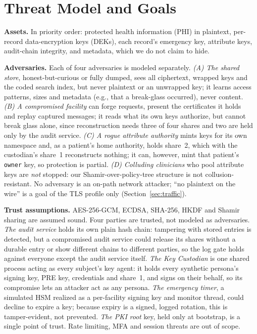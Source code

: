 \section{Threat Model and Goals}\label{sec:threat}

\textbf{Assets.} In priority order: protected health information (PHI) in plaintext, per-record data-encryption
keys (DEKs), each record's emergency key, attribute keys, audit-chain
integrity, and metadata, which we do not claim to hide. %

\textbf{Adversaries.} Each of four adversaries is modeled separately. %
\emph{(A) The shared store}, honest-but-curious or fully dumped, sees all
ciphertext, wrapped keys and the coded search index, but never plaintext or an
unwrapped key; it learns access patterns, sizes and metadata (e.g., that a
break-glass occurred), never content. %
\emph{(B) A compromised facility} can forge requests, present the
certificates it holds and replay captured messages; it reads what its own keys
authorize, but cannot break glass alone, since reconstruction needs three of
four shares and two are held only by the audit service. %
\emph{(C) A rogue attribute authority} mints keys for its own namespace and,
as a patient's home authority, holds share~2, which with the custodian's
share~1 reconstructs nothing; it can, however, mint that patient's
\texttt{owner} key, so protection is partial. %
\emph{(D) Colluding clinicians} who pool attribute keys are \emph{not}
stopped: our Shamir-over-policy-tree structure is not collusion-resistant.
No adversary is an on-path network attacker; ``no plaintext on the wire'' is
a goal of the TLS profile only (Section~\ref{sec:traffic}). %

\textbf{Trust assumptions.} AES-256-GCM, ECDSA, SHA-256, HKDF and Shamir
sharing are assumed sound. %
Four parties are trusted, not modeled as adversaries. %
\emph{The audit service} holds its own plain hash chain: tampering with stored
entries is detected, but a compromised audit service could release its shares
without a durable entry or show different chains to different parties, so
the log gate holds against everyone except the audit service itself. %
\emph{The Key Custodian} is one shared process acting as every subject's key
agent: it holds every synthetic persona's signing key, PRE key, credentials
and share~1, and signs on their behalf, so its compromise lets an attacker
act as any persona. %
\emph{The emergency timer}, a simulated HSM realized as a per-facility
signing key and monitor thread, could decline to expire a key; because expiry
is a signed, logged rotation, this is tamper-evident, not
prevented. %
\emph{The PKI root} key, held only at bootstrap, is a single point of
trust. %
Rate limiting, MFA and session threats are out of scope. %

